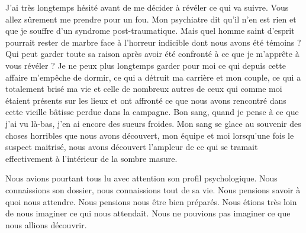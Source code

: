 J’ai très longtemps hésité avant de me décider à révéler ce qui va suivre. Vous
allez sûrement me prendre pour un fou. Mon psychiatre dit qu'il n'en est rien 
et que je souffre d'un syndrome post-traumatique. Mais quel homme saint 
d'esprit pourrait rester de marbre face à l'horreur indicible dont nous avons 
été témoins ? Qui peut garder toute sa raison après avoir été confronté à ce 
que je m’apprête à vous révéler ? Je ne peux plus longtemps garder pour moi ce 
qui depuis cette affaire m’empêche de dormir, ce qui a détruit ma carrière et 
mon couple, ce qui a totalement brisé ma vie et celle de nombreux autres de 
ceux qui comme moi étaient présents sur les lieux et ont affronté ce que nous 
avons rencontré dans cette vieille bâtisse perdue dans la campagne. Bon sang, 
quand je pense à ce que j’ai vu là-bas, j’en ai encore des sueurs
froides. Mon sang se glace au souvenir des choses horribles que nous avons
découvert, mon équipe et moi lorsqu'une fois le suspect maitrisé, nous avons 
découvert l'ampleur de ce qui se tramait effectivement à l’intérieur de la 
sombre masure.

Nous avions pourtant tous lu avec attention son profil psychologique. Nous
connaissions son dossier, nous connaissions tout de sa vie. Nous pensions 
savoir à quoi nous attendre. Nous pensions nous être bien préparés. Nous étions 
très loin de nous imaginer ce qui nous attendait. Nous ne pouvions pas imaginer 
ce que nous allions découvrir. 